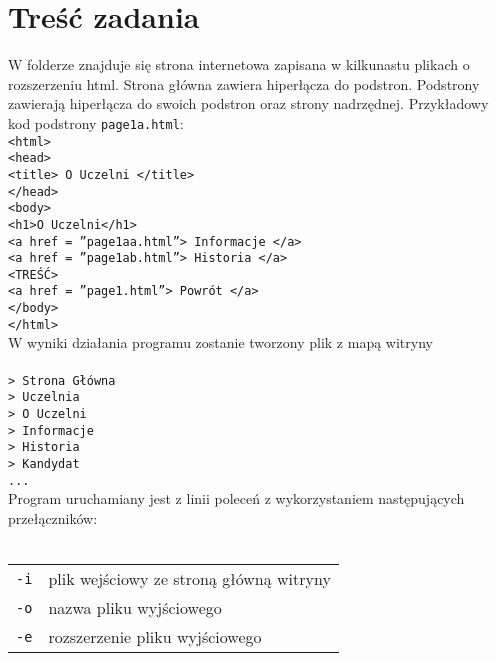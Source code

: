 \documentclass[12pt,a4paper,twoside]{article}
\begin{document}
\section{Treść zadania}
W folderze znajduje się strona internetowa zapisana w kilkunastu plikach o rozszerzeniu html. Strona główna zawiera hiperłącza do podstron. Podstrony zawierają hiperłącza do swoich podstron oraz strony nadrzędnej. Przykładowy kod podstrony \texttt{page1a.html}:\\
\newline
\texttt{<html>}\\
\texttt{<head>}\\
\texttt{<title> O Uczelni </title>}\\
\texttt{</head>}\\
\texttt{<body>}\\
\texttt{<h1>O Uczelni</h1>}\\
\texttt{<a href = ”page1aa.html”> Informacje </a>}\\
\texttt{<a href = ”page1ab.html”> Historia </a>}\\
\newline
\texttt{<TREŚĆ>}\\
\newline
\texttt{<a href = ”page1.html”> Powrót </a>}\\
\texttt{</body>}\\
\texttt{</html>}\\

W wyniki działania programu zostanie tworzony plik z mapą witryny\\
\\
\texttt{> Strona Główna}\\
\texttt{\indent > Uczelnia}\\
\texttt{\indent \indent > O Uczelni}\\
\texttt{\indent \indent \indent > Informacje}\\
\texttt{\indent \indent \indent > Historia}\\
\texttt{\indent > Kandydat}\\
\texttt{...}\\

Program uruchamiany jest z linii poleceń z wykorzystaniem następujących przełączników:\\
\\
\begin{tabular}{ll}
\texttt{-i}  & plik wejściowy ze stroną główną witryny\\
\texttt{-o}  & nazwa pliku wyjściowego\\
\texttt{-e}  & rozszerzenie pliku wyjściowego\\
\end{tabular}
\end{document}
